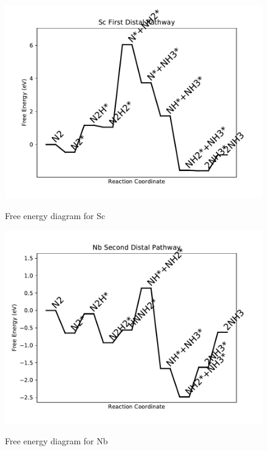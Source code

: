 \documentclass[journal=jacsat,manuscript=article]{achemso}
\begin{document}
\begin{figure}
\includegraphics[width=1\linewidth]{data/plots/Sc_distal_1.pdf}
\label{fig:Sc_distal_1}
\caption{Free energy diagram for Sc}
\end{figure}

\newpage
\begin{figure}
\includegraphics[width=1\linewidth]{data/plots/Nb_distal_2.pdf}
\label{fig:Nb_distal_2}
\caption{Free energy diagram for Nb}
\end{figure}
\end{document}
